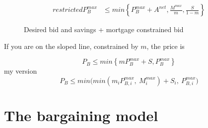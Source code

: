 {\begin{align}
    restricted P_B^{max} &\le min\left\{ P_B^{max} + A^{net},  \frac{M^{max}}{m} , \frac{S}{1-m}  \right\} \label{eqn:maximum-bid-restricted}
\end{align}




 \begin{figure}
    \centering
    
    \caption{Desired bid  and savings + mortgage constrained bid}
    \label{fig:savings-constraint}
    \end{figure}

If you are on the sloped line, constrained by $m$, the price is

\begin{equation}
    P_{B} \le min\left\{m P_B^{max} + S, P_B^{max} \right\} \label{eqn:bid_diagonal}
\end{equation}
my version
\begin{equation}
    P_{B} \le min\Big(  min(m_i P_{B,i}^{max},\ M^{max}_i)+ S_i,\  P_{B,i}^{max}\Big)
\end{equation}


        

    
\section{The bargaining model} \label{sec:bargaining-model}

}
